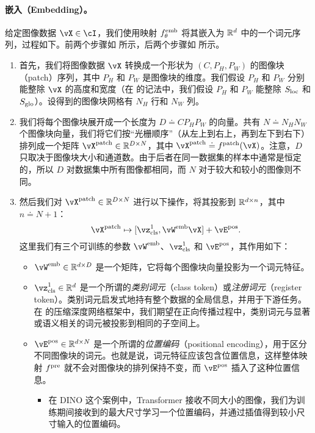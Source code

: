 \documentclass[../../book-main.tex]{subfiles}
\begin{document}
\paragraph{嵌入（Embedding）。} 给定图像数据 \(\vX \in \cI\)，我们使用映射 \(f_{\theta}^{\mathrm{emb}}\) 将其嵌入为 \(\mathbb{R}^{d}\) 中的一个词元序列，过程如下。前两个步骤如  所示，后两个步骤如  所示。
\begin{enumerate}
    \item 首先，我们将图像数据 \(\vX\) 转换成一个形状为 \((C, P_{H}, P_{W})\) 的图像块（patch）序列，其中 \(P_{H}\) 和 \(P_{W}\) 是图像块的维度。我们假设 \(P_{H}\) 和 \(P_{W}\) 分别能整除 \(\vX\) 的高度和宽度（在  的记法中，我们假设 \(P_{H}\) 和 \(P_{W}\) 能整除 \(S_{\mathrm{loc}}\) 和 \(S_{\mathrm{glo}}\)）。设得到的图像块网格有 \(N_{H}\) 行和 \(N_{W}\) 列。
    \item 我们将每个图像块展开成一个长度为 \(D \doteq CP_{H}P_{W}\) 的向量。共有 \(N \doteq N_{H}N_{W}\) 个图像块向量，我们将它们按“光栅顺序”（从左上到右上，再到左下到右下）排列成一个矩阵 \(\vX^{\patch} \in \R^{D \times N}\)，其中 \(\vX^{\patch} \doteq f^{\patch}(\vX)\)。注意，\(D\) 只取决于图像块大小和通道数。由于后者在同一数据集的样本中通常是恒定的，所以 \(D\) 对数据集中所有图像都相同，而 \(N\) 对于较大和较小的图像则不同。
    \item 然后我们对 \(\vX^{\patch} \in \R^{D \times N}\) 进行以下操作，将其投影到 \(\mathbb{R}^{d \times n}\)，其中 \(n \doteq N + 1\)：
    \begin{equation}
        \vX^{\patch} \mapsto [\vz_{\cls}^{1}, \vW^{\emb}\vX] + \vE^{\pos}.
    \end{equation}
    这里我们有三个可训练的参数 \(\vW^{\emb}\)、\(\vz_{\cls}^{1}\) 和 \(\vE^{\pos}\)，其作用如下：
    \begin{itemize}
        \item \(\vW^{\emb} \in \R^{d \times D}\) 是一个矩阵，它将每个图像块向量投影为一个词元特征。
        \item \(\vz_{\cls}^{1} \in \R^{d}\) 是一个所谓的\textit{类别词元}（class token）或\textit{注册词元}（register token）。类别词元启发式地持有整个数据的全局信息，并用于下游任务。在  的压缩深度网络框架中，我们期望在正向传播过程中，类别词元与显著或语义相关的词元被投影到相同的子空间上。
        \item \(\vE^{\pos} \in \R^{d \times N}\) 是一个所谓的\textit{位置编码}（positional encoding），用于区分不同图像块的词元。也就是说，词元特征应该包含位置信息，这样整体映射 \(f^{\mathrm{pre}}\) 就不会对图像块的排列保持不变，而 \(\vE^{\pos}\) 插入了这种位置信息。
        \begin{itemize}
            \item 在 DINO 这个案例中，Transformer 接收不同大小的图像，我们为训练期间接收到的最大尺寸学习一个位置编码，并通过插值得到较小尺寸输入的位置编码。
        \end{itemize}
    \end{itemize}
\end{enumerate}
\end{document}
